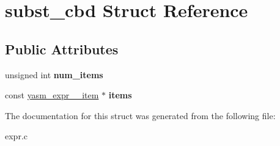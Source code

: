 \hypertarget{structsubst__cbd}{\section{subst\-\_\-cbd Struct Reference}
\label{structsubst__cbd}
}
\subsection*{Public Attributes}
\begin{DoxyCompactItemize}
\item 
\hypertarget{structsubst__cbd_ad52fca2490e884bc9acaae6b793d9864}{unsigned int {\bfseries num\-\_\-items}}\label{structsubst__cbd_ad52fca2490e884bc9acaae6b793d9864}

\item 
\hypertarget{structsubst__cbd_ad0376b54f273323380176d5b79a58d8b}{const \hyperlink{structyasm__expr____item}{yasm\-\_\-expr\-\_\-\-\_\-item} $\ast$ {\bfseries items}}\label{structsubst__cbd_ad0376b54f273323380176d5b79a58d8b}

\end{DoxyCompactItemize}


The documentation for this struct was generated from the following file\-:\begin{DoxyCompactItemize}
\item 
expr.\-c\end{DoxyCompactItemize}
